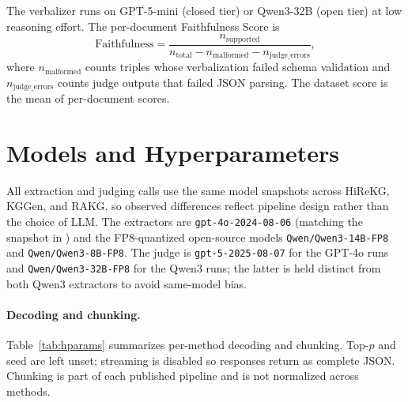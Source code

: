 \documentclass[11pt]{article}
\begin{document}
\noindent The verbalizer runs on GPT-5-mini (closed tier) or Qwen3-32B (open tier) at low reasoning effort. The per-document Faithfulness Score is
\[
\text{Faithfulness} = \frac{n_{\text{supported}}}{n_{\text{total}} - n_{\text{malformed}} - n_{\text{judge\_errors}}},
\]
where $n_{\text{malformed}}$ counts triples whose verbalization failed schema validation and $n_{\text{judge\_errors}}$ counts judge outputs that failed JSON parsing. The dataset score is the mean of per-document scores.




\section{Models and Hyperparameters}
\label{app:hardware}

All extraction and judging calls use the same model snapshots across HiReKG, KGGen, and RAKG, so observed differences reflect pipeline design rather than the choice of LLM. The extractors are \texttt{gpt-4o-2024-08-06} (matching the snapshot in \citealp{kggen}) and the FP8-quantized open-source models \texttt{Qwen/Qwen3-14B-FP8} and \texttt{Qwen/Qwen3-8B-FP8}. The judge is \texttt{gpt-5-2025-08-07} for the GPT-4o runs and \texttt{Qwen/Qwen3-32B-FP8} for the Qwen3 runs; the latter is held distinct from both Qwen3 extractors to avoid same-model bias.

\paragraph{Decoding and chunking.} Table~\ref{tab:hparams} summarizes per-method decoding and chunking. Top-$p$ and seed are left unset; streaming is disabled so responses return as complete JSON. Chunking is part of each published pipeline and is not normalized across methods.
\end{document}
